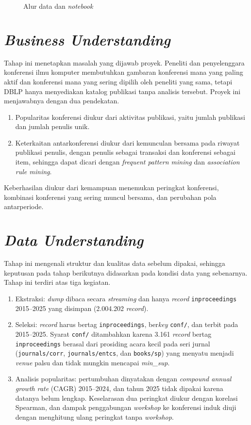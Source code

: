 \begin{figure}[!htb]
\centering
{}
\caption{Alur data dan \textit{notebook}}
\label{fig:alur-kerja}
\end{figure}

\section{\textit{Business Understanding}}
Tahap ini menetapkan masalah yang dijawab proyek. Peneliti dan penyelenggara konferensi ilmu komputer membutuhkan gambaran konferensi mana yang paling aktif dan konferensi mana yang sering dipilih oleh peneliti yang sama, tetapi DBLP hanya menyediakan katalog publikasi tanpa analisis tersebut. Proyek ini menjawabnya dengan dua pendekatan.
\begin{enumerate}
\item Popularitas konferensi diukur dari aktivitas publikasi, yaitu jumlah publikasi dan jumlah penulis unik.
\item Keterkaitan antarkonferensi diukur dari kemunculan bersama pada riwayat publikasi penulis, dengan penulis sebagai transaksi dan konferensi sebagai item, sehingga dapat dicari dengan \textit{frequent pattern mining} dan \textit{association rule mining}.
\end{enumerate}
Keberhasilan diukur dari kemampuan menemukan peringkat konferensi, kombinasi konferensi yang sering muncul bersama, dan perubahan pola antarperiode.

\section{\textit{Data Understanding}}
\label{sec:ekstraksi}
Tahap ini mengenali struktur dan kualitas data sebelum dipakai, sehingga keputusan pada tahap berikutnya didasarkan pada kondisi data yang sebenarnya. Tahap ini terdiri atas tiga kegiatan.
\begin{enumerate}
\item Ekstraksi: \textit{dump} dibaca secara \textit{streaming} dan hanya \textit{record} \texttt{inproceedings} 2015--2025 yang disimpan (2.004.202 \textit{record}).
\item Seleksi: \textit{record} harus bertag \texttt{inproceedings}, ber\textit{key} \texttt{conf/}, dan terbit pada 2015--2025. Syarat \texttt{conf/} ditambahkan karena 3.161 \textit{record} bertag \texttt{inproceedings} berasal dari prosiding acara kecil pada seri jurnal (\texttt{journals/corr}, \texttt{journals/entcs}, dan \texttt{books/sp}) yang menyatu menjadi \textit{venue} palsu dan tidak mungkin mencapai \textit{min\_sup}.
\item Analisis popularitas: pertumbuhan dinyatakan dengan \textit{compound annual growth rate} (CAGR) 2015--2024, dan tahun 2025 tidak dipakai karena datanya belum lengkap. Keselarasan dua peringkat diukur dengan korelasi Spearman, dan dampak penggabungan \textit{workshop} ke konferensi induk diuji dengan menghitung ulang peringkat tanpa \textit{workshop}.
\end{enumerate}

